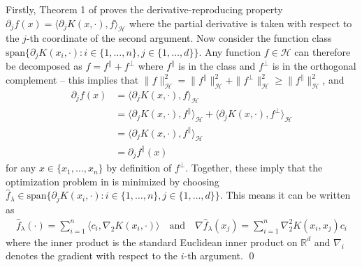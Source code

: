 \documentclass[11pt]{article}
\begin{document}
Firstly, Theorem 1 of \citet{zhou2008derivative} proves the derivative-reproducing property $\partial_{j} f(x) = \langle \partial_{j} K(x, \cdot), f\rangle_{\mathcal{H}}$ where the partial derivative is taken with respect to the $j$-th coordinate of the second argument. Now consider the function class $\text{span}\{\partial_{j}K(x_i, \cdot) : i \in \{1, \dots , n\}, j \in \{1, \dots, d\}\}$. Any function $f \in \mathcal{H}$ can therefore be decomposed as $f = f^{\parallel} + f^{\perp}$ where $f^\parallel$ is in the class and $f^\perp$ is in the orthogonal complement -- this implies that $\|f\|_{\mathcal{H}}^2 = \|f^{\parallel}\|_{\mathcal{H}}^2 + \|f^\perp\|_{\mathcal{H}}^2 \geq \|f^{\parallel}\|_{\mathcal{H}}^2$, and 
\begin{align*}
    \partial_{j}f(x) &= \langle \partial_{j}K(x, \cdot), f \rangle _{\mathcal{H}} \tag{reproducing property} \\
    &= \langle \partial_{j}K(x, \cdot), f^{\parallel} \rangle _{\mathcal{H}} + \langle \partial_{j}K(x, \cdot), f^{\perp} \rangle _{\mathcal{H}} \\
    &= \langle \partial_{j}K(x, \cdot), f^{\parallel} \rangle _{\mathcal{H}} \\
    &= \partial_{j}f^\parallel(x) \tag{reproducing property}
\end{align*}
for any $x \in \{x_1, \dots, x_n\}$ by definition of $f^\perp$. Together, these imply that the optimization problem in  is minimized by choosing $\hat f_\lambda \in \text{span}\{\partial_{j} K(x_i, \cdot): i \in \{1, \dots, n\}, j \in \{1, \dots, d\}\}.$ This means it can be written as 
\begin{align*}
    \hat f_\lambda (\cdot ) = \sum_{i = 1}^n \langle c_i, \nabla_2 K(x_i, \cdot) \rangle \quad \text{and} \quad \nabla \hat f_\lambda (x_j) = \sum_{i = 1}^n \nabla_2^2K(x_i, x_j) c_i
\end{align*}
where the inner product is the standard Euclidean inner product on $\mathbb{R}^d$ and $\nabla_i$ denotes the gradient with respect to the $i$-th argument. 
\qed{}
\end{document}
